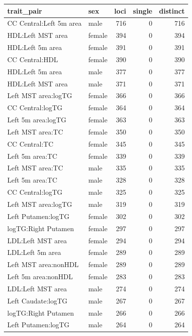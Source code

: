 \begin{table}[ht]
\centering
\begin{tabular}{llrrr}
  \hline
trait\_pair & sex & loci & single & distinct \\ 
  \hline
CC Central:Left 5m area & male & 716 &   0 & 716 \\ 
  HDL:Left MST area & female & 394 &   0 & 394 \\ 
  HDL:Left 5m area & female & 391 &   0 & 391 \\ 
  CC Central:HDL & female & 390 &   0 & 390 \\ 
  HDL:Left 5m area & male & 377 &   0 & 377 \\ 
  HDL:Left MST area & male & 371 &   0 & 371 \\ 
  Left MST area:logTG & female & 366 &   0 & 366 \\ 
  CC Central:logTG & female & 364 &   0 & 364 \\ 
  Left 5m area:logTG & female & 363 &   0 & 363 \\ 
  Left MST area:TC & female & 350 &   0 & 350 \\ 
  CC Central:TC & female & 345 &   0 & 345 \\ 
  Left 5m area:TC & female & 339 &   0 & 339 \\ 
  Left MST area:TC & male & 335 &   0 & 335 \\ 
  Left 5m area:TC & male & 328 &   0 & 328 \\ 
  CC Central:logTG & male & 325 &   0 & 325 \\ 
  Left MST area:logTG & male & 319 &   0 & 319 \\ 
  Left Putamen:logTG & female & 302 &   0 & 302 \\ 
  logTG:Right Putamen & female & 297 &   0 & 297 \\ 
  LDL:Left MST area & female & 294 &   0 & 294 \\ 
  LDL:Left 5m area & female & 289 &   0 & 289 \\ 
  Left MST area:nonHDL & female & 289 &   0 & 289 \\ 
  Left 5m area:nonHDL & female & 283 &   0 & 283 \\ 
  LDL:Left MST area & male & 274 &   0 & 274 \\ 
  Left Caudate:logTG & male & 267 &   0 & 267 \\ 
  logTG:Right Putamen & male & 266 &   0 & 266 \\ 
  Left Putamen:logTG & male & 264 &   0 & 264 \\ 

\end{tabular}
\end{table}

